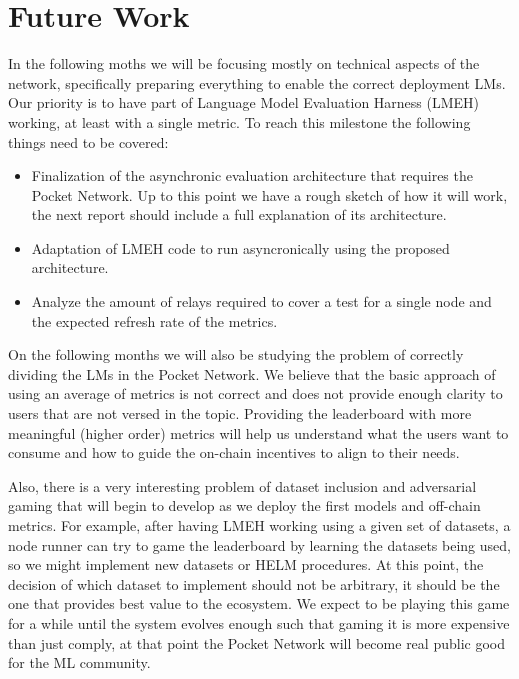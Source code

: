 \section{Future Work}\label{sec:ref}

In the following moths we will be focusing mostly on technical aspects of the network, specifically preparing everything to enable the correct deployment LMs. Our priority is to have part of Language Model Evaluation Harness (LMEH)~\cite{eval-harness} working, at least with a single metric.
To reach this milestone the following things need to be covered:
\begin{itemize}
    \item Finalization of the asynchronic evaluation architecture that requires the Pocket Network. Up to this point we have a rough sketch of how it will work, the next report should include a full explanation of its architecture. 
    \item Adaptation of LMEH code to run asyncronically using the proposed architecture.
    \item Analyze the amount of relays required to cover a test for a single node and the expected refresh rate of the metrics.
\end{itemize}

On the following months we will also be studying the problem of correctly dividing the LMs in the Pocket Network. We believe that the basic approach of using an average of metrics is not correct and does not provide enough clarity to users that are not versed in the topic. Providing the leaderboard with more meaningful (higher order) metrics will help us understand what the users want to consume and how to guide the on-chain incentives to align to their needs.

Also, there is a very interesting problem of dataset inclusion and adversarial gaming that will begin to develop as we deploy the first models and off-chain metrics. For example, after having LMEH working using a given set of datasets, a node runner can try to game the leaderboard by learning the datasets being used, so we might implement new datasets or HELM procedures. At this point, the decision of which dataset to implement should not be arbitrary, it should be the one that provides best value to the ecosystem. We expect to be playing this game for a while until the system evolves enough such that gaming it is more expensive than just comply, at that point the Pocket Network will become real public good for the ML community.
